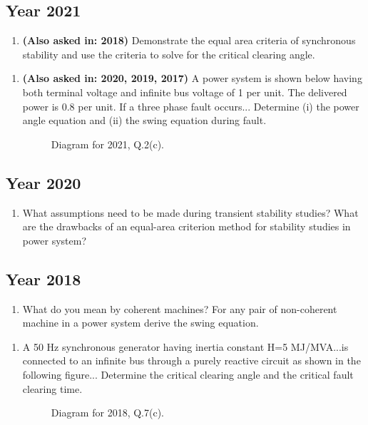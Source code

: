 \documentclass[12pt, a4paper]{article}
\begin{document}
	\subsection{Year 2021}
	\begin{enumerate}[label=\textbf{Q2(b).}, wide, labelindent=0pt]
		\item \textbf{(Also asked in: 2018)} Demonstrate the equal area criteria of synchronous stability and use the criteria to solve for the critical clearing angle.
	\end{enumerate}
	\begin{enumerate}[label=\textbf{Q2(c).}, wide, labelindent=0pt]
		\item \textbf{(Also asked in: 2020, 2019, 2017)} A power system is shown below having both terminal voltage and infinite bus voltage of 1 per unit. The delivered power is 0.8 per unit. If a three phase fault occurs... Determine (i) the power angle equation and (ii) the swing equation during fault.
		\begin{figure}[h!]
			\centering
			\caption{Diagram for 2021, Q.2(c).}
		\end{figure}
	\end{enumerate}
	
	\subsection{Year 2020}
	\begin{enumerate}[label=\textbf{Q2(b).}, wide, labelindent=0pt]
		\item What assumptions need to be made during transient stability studies? What are the drawbacks of an equal-area criterion method for stability studies in power system?
	\end{enumerate}
	
	\subsection{Year 2018}
	\begin{enumerate}[label=\textbf{Q6(a).}, wide, labelindent=0pt]
		\item What do you mean by coherent machines? For any pair of non-coherent machine in a power system derive the swing equation.
	\end{enumerate}
	\begin{enumerate}[label=\textbf{Q7(c).}, wide, labelindent=0pt]
		\item A 50 Hz synchronous generator having inertia constant H=5 MJ/MVA...is connected to an infinite bus through a purely reactive circuit as shown in the following figure... Determine the critical clearing angle and the critical fault clearing time.
		\begin{figure}[h!]
			\centering
			\caption{Diagram for 2018, Q.7(c).}
		\end{figure}
	\end{enumerate}
	
\end{document}
